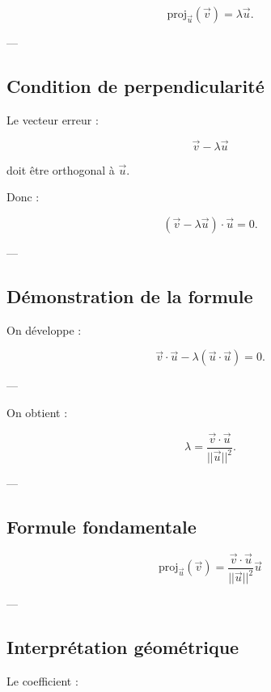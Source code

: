 \documentclass[11pt,a4paper]{article}
\begin{document}
\[
\text{proj}_{\vec{u}}(\vec{v}) = \lambda \vec{u}.
\]

---

\subsection{Condition de perpendicularité}

Le vecteur erreur :

\[
\vec{v} - \lambda \vec{u}
\]

doit être orthogonal à $\vec{u}$.

\bigskip

Donc :

\[
(\vec{v} - \lambda \vec{u}) \cdot \vec{u} = 0.
\]

---

\subsection{Démonstration de la formule}

On développe :

\[
\vec{v} \cdot \vec{u} - \lambda (\vec{u} \cdot \vec{u}) = 0.
\]

---

On obtient :

\[
\lambda = \frac{\vec{v} \cdot \vec{u}}{||\vec{u}||^2}.
\]

---

\subsection{Formule fondamentale}

\[
\boxed{
\text{proj}_{\vec{u}}(\vec{v}) =
\frac{\vec{v} \cdot \vec{u}}{||\vec{u}||^2} \vec{u}
}
\]

---

\subsection{Interprétation géométrique}

Le coefficient :
\end{document}
